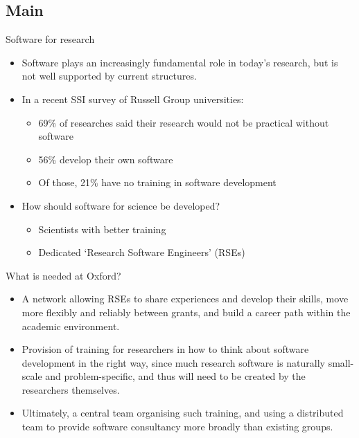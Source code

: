 \documentclass[t,xcolor={usenames,dvipsnames}]{beamer}
\begin{document}
\subsection*{Main}

\begin{frame}{Software for research}
\begin{itemize}
\item Software plays an increasingly fundamental role in today's research, but is not well supported by current structures.
\item In a recent SSI survey of Russell Group universities:
  \begin{itemize}
  \item 69\% of researches said their research would not be practical without software
  \item 56\% develop their own software
  \item Of those, 21\% have no training in software development
  \end{itemize}
\item How should software for science be developed?
  \begin{itemize}
  \item Scientists with better training
  \item Dedicated `Research Software Engineers' (RSEs)
  \end{itemize}
\end{itemize}
\end{frame}

\begin{frame}{What is needed at Oxford?}
\begin{itemize}
\item A \alert{network} allowing RSEs to share experiences and develop their skills, move more flexibly and reliably between grants, and build a \alert{career path} within the academic environment.
\item Provision of \alert{training for researchers} in how to think about software development in the right way, since much research software is naturally small-scale and problem-specific, and thus will need to be created by the researchers themselves.
\item Ultimately, a central team organising such training, and using a distributed team to provide \alert{software consultancy} more broadly than existing groups.
\end{itemize}
\end{frame}
\end{document}
